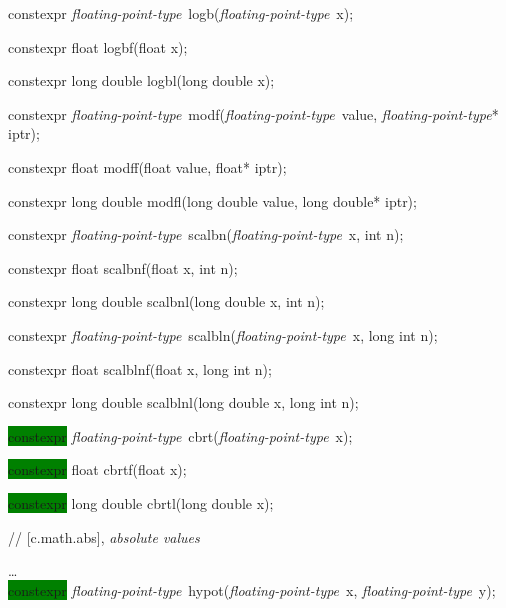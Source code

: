 \documentclass[prd,twocolumn,amsmath,amssymb,nofootinbib,eqsecnum]{revtex4-1}
\newcommand{\highlight}[1]{\colorbox{green}{\!\!\!\! #1}}
\newcommand{\oldhighlight}[1]{#1}
\newcommand{\fptype}{{\it floating-point-type}}
\begin{document}
{\vspace{2ex}


\oldhighlight{constexpr} \fptype\ logb(\fptype\ x);

\oldhighlight{constexpr} float logbf(float x);

\oldhighlight{constexpr} long double logbl(long double x);

\vspace{2ex}


\oldhighlight{constexpr} \fptype\ modf(\fptype\ value, \fptype* iptr);

\oldhighlight{constexpr}  float modff(float value, float* iptr);

\oldhighlight{constexpr}  long double modfl(long double value, long double* iptr);

\vspace{2ex}


\oldhighlight{constexpr} \fptype\ scalbn(\fptype\ x, int n);

\oldhighlight{constexpr} float scalbnf(float x, int n);

\oldhighlight{constexpr} long double scalbnl(long double x, int n);

\vspace{2ex}


\oldhighlight{constexpr} \fptype\ scalbln(\fptype\ x, long int n);

\oldhighlight{constexpr} float scalblnf(float x, long int n);

\oldhighlight{constexpr} long double scalblnl(long double x, long int n);

\vspace{2ex}

\highlight{constexpr} \fptype\ cbrt(\fptype\ x);

\highlight{constexpr} float cbrtf(float x);

\highlight{constexpr} long double cbrtl(long double x);

\vspace{2ex}

//  [c.math.abs], {\it absolute values}




\ldots
\\

\highlight{constexpr} \fptype\ hypot(\fptype\ x, \fptype\ y); 

}
\end{document}
